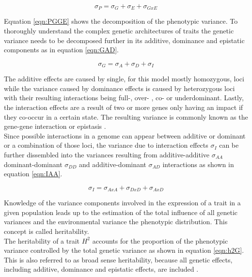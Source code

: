 \begin{equation}
 \sigma_{P} = \sigma_{G} + \sigma_{E} + \sigma_{GxE}
 \label{eqn:PGGE}
\end{equation}

Equation \ref{eqn:PGGE} shows the decomposition of the phenotypic variance. To thoroughly
understand the complex genetic architectures of traits the genetic variance needs to be
decomposed further in its additive, dominance and epistatic components as in equation
\ref{eqn:GAD}.

\begin{equation}
 \sigma_{G} = \sigma_{A} + \sigma_{D} + \sigma_{I}
 \label{eqn:GAD}
\end{equation}

The additive effects are caused by single, for this model mostly homozygous, loci while
the variance caused by dominance effects is caused by heterozygous loci with their
resulting interactions being full-, over- , co- or underdominant. Lastly, the interaction
effects are a result of two or more genes only having an impact if they co-occur in a
certain state. The resulting variance is commonly known as the gene-gene interaction or epistasis \cite{falconer1996}. \\
Since possible interactions in a genome can appear between additive or dominant or a
combination of those loci, the variance due to interaction effects $\sigma_{I}$ can be
further dissembled into the variances resulting from additive-additive $\sigma_{AA}$
dominant-dominant $\sigma_{DD}$ and additive-dominant $\sigma_{AD}$ interactions as shown
in equation \ref{eqn:IAA}.

\begin{equation}
 \sigma_{I} = \sigma_{AxA} + \sigma_{DxD} + \sigma_{AxD}
 \label{eqn:IAA}
\end{equation}

Knowledge of the variance components involved in the expression of a trait in a given
population leads up to the estimation of the total influence of all genetic variances and
the environmental variance the phenotypic distribution. This concept is called
heritability. \\
The heritability of a trait $H^2$ accounts for the proportion of the phenotypic variance
controlled by the total genetic variance as shown in equation \ref{eqn:h2G}. This is also
referred to as broad sense heritability, because all genetic effects, including additive,
dominance and epistatic effects, are included \cite{brooker1999genetics}.

